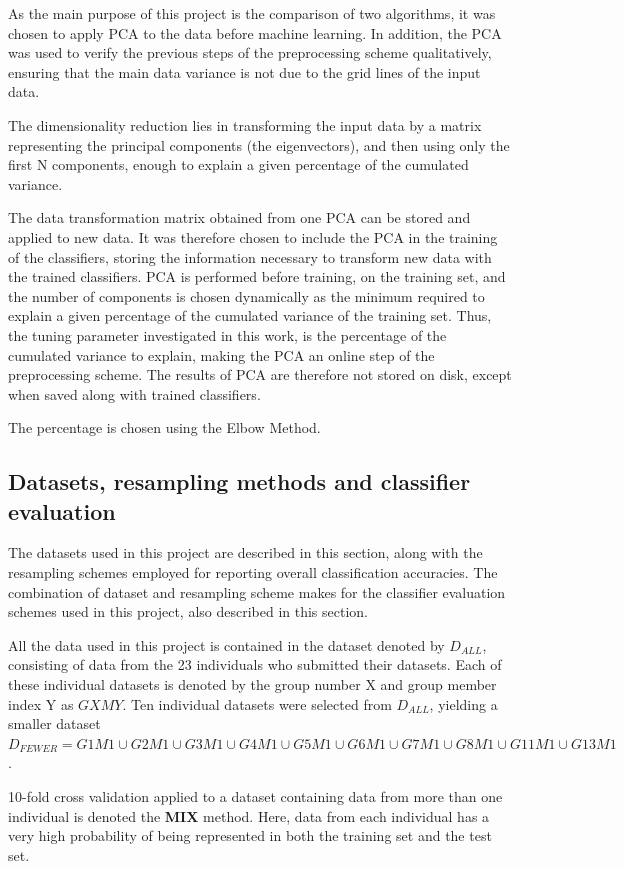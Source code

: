 As the main purpose of this project is the comparison of two algorithms,
it was chosen to apply PCA to the data before machine learning.
In addition, the PCA was used to verify the previous
steps of the preprocessing scheme qualitatively,
ensuring that the main data variance is not due to the grid lines of the input data.

The dimensionality reduction lies in transforming the input
data by a matrix representing the principal components
(the eigenvectors), and then using only the
first N components, enough to explain a given percentage of the cumulated variance.

The data transformation matrix obtained from one PCA
can be stored and applied to new data.
It was therefore chosen to include the PCA in the training of the classifiers,
storing the information necessary to transform new data
with the trained classifiers.
PCA is performed before training, on the training set,
and the number of components is chosen dynamically as the minimum
required to explain a given percentage of the cumulated variance
of the training set.
Thus, the tuning parameter investigated in this work,
is the percentage of the cumulated variance to explain,
making the PCA an online step of the preprocessing scheme.
The results of PCA are therefore not stored on disk,
except when saved along with trained classifiers.

The percentage is chosen using the Elbow Method.

\subsection{Datasets, resampling methods and classifier evaluation}
The datasets used in this project are described in this section,
along with the resampling schemes employed for reporting
overall classification accuracies.
The combination of dataset and resampling scheme makes
for the classifier evaluation schemes used in this project,
also described in this section.

All the data used in this project is contained in the dataset
denoted by \(D_{ALL}\), consisting of data from the 23
individuals who submitted their datasets.
Each of these individual datasets is denoted by the group number X
and group member index Y as \(GXMY\).
Ten individual datasets were selected from \(D_{ALL}\),
yielding a smaller dataset
\(D_{FEWER}=G1M1\cup G2M1\cup G3M1\cup G4M1\cup G5M1\cup G6M1\cup G7M1\cup G8M1\cup G11M1\cup G13M1\).

10-fold cross validation applied to a dataset containing data from more than
one individual is denoted the \textbf{MIX} method.
Here, data from each individual has a very high probability of
being represented in both the training set and the test set.

